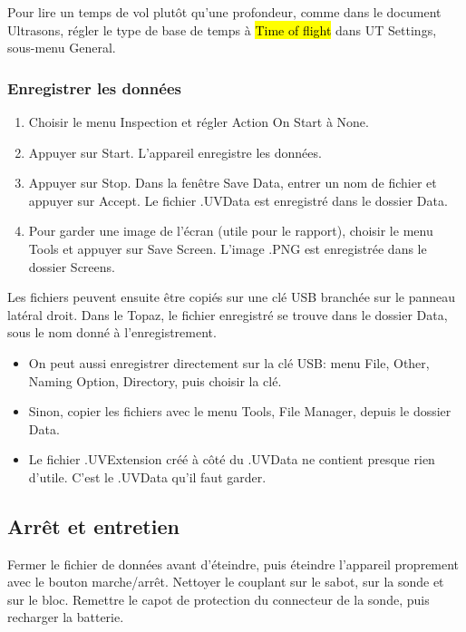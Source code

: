 \documentclass[11pt,letterpaper]{article}
\begin{document}
Pour lire un temps de vol plut\^ot qu'une profondeur, comme dans le document Ultrasons, r\'egler le type de base de temps \`a \hl{Time of flight} dans UT Settings, sous-menu General.

\subsubsection*{Enregistrer les donn\'ees}

\begin{enumerate}
  \item Choisir le menu Inspection et r\'egler Action On Start \`a None.
  \item Appuyer sur Start. L'appareil enregistre les donn\'ees.
  \item Appuyer sur Stop. Dans la fen\^etre Save Data, entrer un nom de fichier et appuyer sur Accept. Le fichier .UVData est enregistr\'e dans le dossier Data.
  \item Pour garder une image de l'\'ecran (utile pour le rapport), choisir le menu Tools et appuyer sur Save Screen. L'image .PNG est enregistr\'ee dans le dossier Screens.
\end{enumerate}

Les fichiers peuvent ensuite \^etre copi\'es sur une cl\'e USB branch\'ee sur le panneau lat\'eral droit. Dans le Topaz, le fichier enregistr\'e se trouve dans le dossier Data, sous le nom donn\'e \`a l'enregistrement.

\begin{itemize}
  \item On peut aussi enregistrer directement sur la cl\'e USB: menu File, Other, Naming Option, Directory, puis choisir la cl\'e.
  \item Sinon, copier les fichiers avec le menu Tools, File Manager, depuis le dossier Data.
  \item Le fichier .UVExtension cr\'e\'e \`a c\^ot\'e du .UVData ne contient presque rien d'utile. C'est le .UVData qu'il faut garder.
\end{itemize}

\subsection{Arr\^et et entretien}

Fermer le fichier de donn\'ees avant d'\'eteindre, puis \'eteindre l'appareil proprement avec le bouton marche/arr\^et. Nettoyer le couplant sur le sabot, sur la sonde et sur le bloc. Remettre le capot de protection du connecteur de la sonde, puis recharger la batterie.
\end{document}
